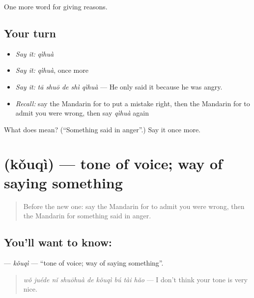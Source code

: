 \begin{grammarlens}[title={What you've built}]
One more word for giving reasons.
\end{grammarlens}

\subsection*{Your turn}
\begin{itemize}
\raggedright
  \item \emph{Say it:} \emph{qìhuà}
  \item \emph{Say it:} \emph{qìhuà}, once more
  \item \emph{Say it:} \emph{tā shuō de shì qìhuà} — He only said it because he was angry.
  \item \emph{Recall:} say the Mandarin for to put a mistake right, then the Mandarin for to admit you were wrong, then say \emph{qìhuà} again
\end{itemize}

\begin{tcolorbox}[breakable,colback=teal!4,colframe=teal!35!black,title={Before you move on}]
What does  mean? (\textquotedblleft{}Something said in anger\textquotedblright{}.) Say it once more.
\end{tcolorbox}
\section[\texorpdfstring{\zh{口气} (kǒuqì)}{口气 (kǒuqì)}]{ (kǒuqì) — tone of voice; way of saying something}

\label{lesson:ZH-C357-kouqi}



\begin{quote}
Before the new one: say the Mandarin for to admit you were wrong, then the Mandarin for something said in anger.
\end{quote}

\subsection*{You'll want to know: }
\textbf{} — \emph{kǒuqì} — \textquotedblleft{}tone of voice; way of saying something\textquotedblright{}.

\begin{quote}
\textbf{} \emph{wǒ juéde nǐ shuōhuà de kǒuqì bú tài hǎo} — I don't think your tone is very nice.
\end{quote}

